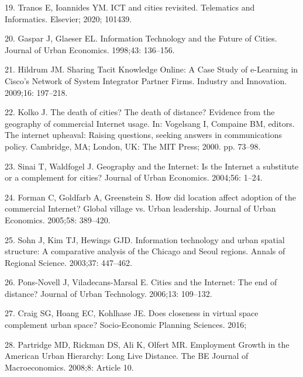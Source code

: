 \documentclass[10pt,letterpaper]{article}
\begin{document}
\leavevmode\hypertarget{ref-tranos2020ict}{}%
19. Tranos E, Ioannides YM. ICT and cities revisited. Telematics and
Informatics. Elsevier; 2020; 101439.

\leavevmode\hypertarget{ref-jess_gaspar_information_1998}{}%
20. Gaspar J, Glaeser EL. Information Technology and the Future of
Cities. Journal of Urban Economics. 1998;43: 136--156.

\leavevmode\hypertarget{ref-hildrum_sharing_2009}{}%
21. Hildrum JM. Sharing Tacit Knowledge Online: A Case Study of
e-Learning in Cisco's Network of System Integrator Partner Firms.
Industry and Innovation. 2009;16: 197--218.

\leavevmode\hypertarget{ref-kolko_death_2000}{}%
22. Kolko J. The death of cities? The death of distance? Evidence from
the geography of commercial Internet usage. In: Vogelsang I, Compaine
BM, editors. The internet upheaval: Raising questions, seeking answers
in communications policy. Cambridge, MA; London, UK: The MIT Press;
2000. pp. 73--98.

\leavevmode\hypertarget{ref-todd_sinai_geography_2004}{}%
23. Sinai T, Waldfogel J. Geography and the Internet: Is the Internet a
substitute or a complement for cities? Journal of Urban Economics.
2004;56: 1--24.

\leavevmode\hypertarget{ref-chris_forman_how_2005}{}%
24. Forman C, Goldfarb A, Greenstein S. How did location affect adoption
of the commercial Internet? Global village vs. Urban leadership. Journal
of Urban Economics. 2005;58: 389--420.

\leavevmode\hypertarget{ref-jungyul_sohn_information_2003}{}%
25. Sohn J, Kim TJ, Hewings GJD. Information technology and urban
spatial structure: A comparative analysis of the Chicago and Seoul
regions. Annals of Regional Science. 2003;37: 447--462.

\leavevmode\hypertarget{ref-pons-novell_cities_2006}{}%
26. Pons-Novell J, Viladecans-Marsal E. Cities and the Internet: The end
of distance? Journal of Urban Technology. 2006;13: 109--132.

\leavevmode\hypertarget{ref-craig_does_2016}{}%
27. Craig SG, Hoang EC, Kohlhase JE. Does closeness in virtual space
complement urban space? Socio-Economic Planning Sciences. 2016;

\leavevmode\hypertarget{ref-mark_d_partridge_employment_2008}{}%
28. Partridge MD, Rickman DS, Ali K, Olfert MR. Employment Growth in the
American Urban Hierarchy: Long Live Distance. The BE Journal of
Macroeconomics. 2008;8: Article 10.
\end{document}
